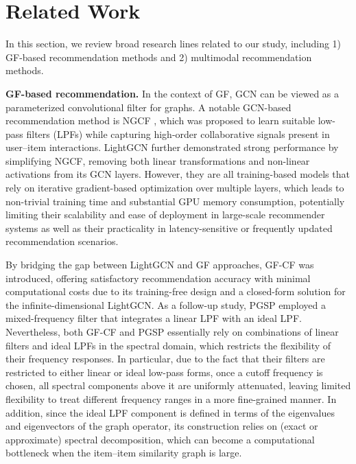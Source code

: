 \documentclass[a4paper,fleqn]{cas-sc}
\renewcommand{\cite}{\citep}
\begin{document}
\section{Related Work}
\label{section 2}
In this section, we review broad research lines related to our study, including 1) GF-based recommendation methods and 2) multimodal recommendation methods.

\textbf{GF-based recommendation.}
In the context of GF, GCN \cite{DBLP:conf/iclr/KipfW17} can be viewed as a parameterized convolutional filter for graphs. A notable GCN-based recommendation method is NGCF \cite{DBLP:conf/sigir/Wang0WFC19}, which was proposed to learn suitable low-pass filters (LPFs) while capturing high-order collaborative signals present in user--item interactions. LightGCN \cite{DBLP:conf/sigir/0001DWLZ020} further demonstrated strong performance by simplifying NGCF, removing both linear transformations and non-linear activations from its GCN layers. However, they are all training-based models that rely on iterative gradient-based optimization over multiple layers, which leads to non-trivial training time and substantial GPU memory consumption, potentially limiting their scalability and ease of deployment in large-scale recommender systems as well as their practicality in latency-sensitive or frequently updated recommendation scenarios.

By bridging the gap between LightGCN and GF approaches, GF-CF \cite{DBLP:conf/cikm/ShenWZSZLL21} was introduced, offering satisfactory recommendation accuracy with minimal computational costs due to its training-free design and a closed-form solution for the infinite-dimensional LightGCN. As a follow-up study, PGSP \cite{DBLP:conf/www/LiuLGL0SG23} employed a mixed-frequency filter that integrates a linear LPF with an ideal LPF. Nevertheless, both GF-CF and PGSP essentially rely on combinations of linear filters and ideal LPFs in the spectral domain, which restricts the flexibility of their frequency responses. In particular, due to the fact that their filters are restricted to either linear or ideal low-pass forms, once a cutoff frequency is chosen, all spectral components above it are uniformly attenuated, leaving limited flexibility to treat different frequency ranges in a more fine-grained manner. In addition, since the ideal LPF component is defined in terms of the eigenvalues and eigenvectors of the graph operator, its construction relies on (exact or approximate) spectral decomposition, which can become a computational bottleneck when the item--item similarity graph is large.
\end{document}
